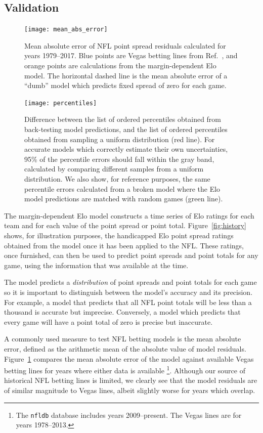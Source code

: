 \documentclass[aps,prc,reprint,amsmath,superscriptaddress]{revtex4-1}
\begin{document}
\subsection{Validation}

\begin{figure}
    \texttt{[image: mean\_abs\_error]}
    \caption{\label{fig:mean_abs_error} Mean absolute error of NFL point spread residuals calculated for years 1979--2017. Blue points are Vegas betting lines from Ref.~\cite{vegaslines}, and orange points are calculations from the margin-dependent Elo model. The horizontal dashed line is the mean absolute error of a ``dumb'' model which predicts fixed spread of zero for each game.}
\end{figure}

\begin{figure}
  \texttt{[image: percentiles]}
  \caption{\label{fig:percentiles} Difference between the list of ordered percentiles obtained from back-testing model predictions, and the list of ordered percentiles obtained from sampling a uniform distribution (red line).
For accurate models which correctly estimate their own uncertainties, 95\% of the percentile errors should fall within the gray band, calculated by comparing different samples from a uniform distribution.
  We also show, for reference purposes, the same percentile errors calculated from a broken model where the Elo model predictions are matched with random games (green line).
  }
\end{figure}

The margin-dependent Elo model constructs a time series of Elo ratings for each team and for each value of the point spread or point total.
Figure~\ref{fig:history} shows, for illustration purposes, the handicapped Elo point spread ratings obtained from the model once it has been applied to the NFL.
These ratings, once furnished, can then be used to predict point spreads and point totals for any game, using the information that was available at the time.

The model predicts a \emph{distribution} of point spreads and point totals for each game so it is important to distinguish between the model's accuracy and its precision. 
For example, a model that predicts that all NFL point totals will be less than a thousand is accurate but imprecise.
Conversely, a model which predicts that every game will have a point total of zero is precise but inaccurate.

A commonly used measure to test NFL betting models is the mean absolute error, defined as the arithmetic mean of the absolute value of model residuals.
Figure~\ref{fig:mean_abs_error} compares the mean absolute error of the model against available Vegas betting lines for years where either data is available \footnote{The \texttt{nfldb} database includes years 2009--present. The Vegas lines are for years 1978--2013.}.
Although our source of historical NFL betting lines is limited, we clearly see that the model residuals are of similar magnitude to Vegas lines, albeit slightly worse for years which overlap.
\end{document}
